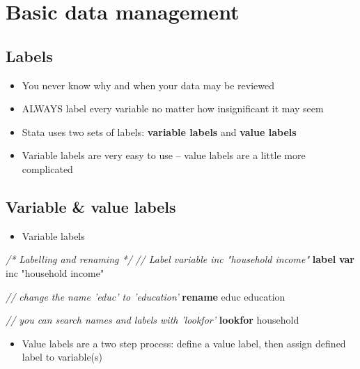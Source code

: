 \documentclass[]{book}
\newenvironment{Shaded}{\begin{snugshade}}{\end{snugshade}}
\newcommand{\CommentTok}[1]{\textcolor[rgb]{0.56,0.35,0.01}{\textit{#1}}}
\newcommand{\KeywordTok}[1]{\textcolor[rgb]{0.13,0.29,0.53}{\textbf{#1}}}
\newcommand{\NormalTok}[1]{#1}
\newcommand{\StringTok}[1]{\textcolor[rgb]{0.31,0.60,0.02}{#1}}
\providecommand{\tightlist}{%
  \setlength{\itemsep}{0pt}\setlength{\parskip}{0pt}}
\begin{document}
\hypertarget{basic-data-management}{%
\section{Basic data management}\label{basic-data-management}}

\hypertarget{labels}{%
\subsection{Labels}\label{labels}}

\begin{itemize}
\tightlist
\item
  You never know why and when your data may be reviewed
\item
  ALWAYS label every variable no matter how insignificant it may seem
\item
  Stata uses two sets of labels: \textbf{variable labels} and \textbf{value labels}
\item
  Variable labels are very easy to use -- value labels are a little more complicated
\end{itemize}

\hypertarget{variable-value-labels}{%
\subsection{Variable \& value labels}\label{variable-value-labels}}

\begin{itemize}
\tightlist
\item
  Variable labels
\end{itemize}

\begin{Shaded}
\begin{Highlighting}[]
  \CommentTok{/* Labelling and renaming */}
  \CommentTok{// Label variable inc "household income"}
  \KeywordTok{label} \KeywordTok{var}\NormalTok{ inc }\StringTok{"household income"}

  \CommentTok{// change the name 'educ' to 'education'}
  \KeywordTok{rename}\NormalTok{ educ education}

  \CommentTok{// you can search names and labels with 'lookfor' }
  \KeywordTok{lookfor}\NormalTok{ household}
\end{Highlighting}
\end{Shaded}

\begin{itemize}
\tightlist
\item
  Value labels are a two step process: define a value label, then assign defined label to variable(s)
\end{itemize}
\end{document}
